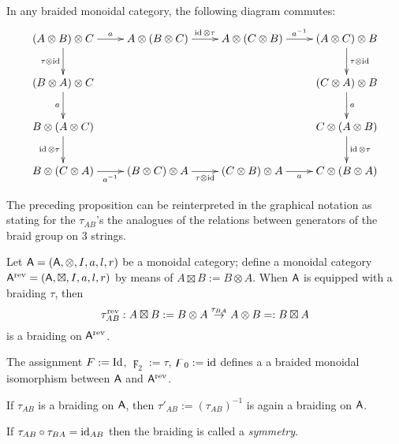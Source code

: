 \begin{proposition}
  In any braided monoidal category, the following diagram commutes:
  \begin{equation*}
    \xymatrix{%
      (A\otimes B)\otimes C
      &
      A\otimes(B\otimes C)
      &
      A\otimes(C\otimes B)
      &
      (A\otimes C)\otimes B
      \\
      (B\otimes A)\otimes C
      &
      &
      &
      (C\otimes A)\otimes B
      \\
      B\otimes(A\otimes C)
      &
      &
      &
      C\otimes(A\otimes B)
      \\
      B\otimes(C\otimes A)
      &
      (B\otimes C)\otimes A
      &
      (C\otimes B)\otimes A
      &
      C\otimes(B\otimes A)
      \ar"1,1";"1,2" ^{a} 
      \ar"1,2";"1,3" ^{\id\otimes\tau}
      \ar"1,3";"1,4" ^{a\inv}
      \ar"1,1";"2,1" _{\tau\otimes\id}
      \ar"1,4";"2,4" ^{\tau\otimes\id}
      \ar"2,1";"3,1" _{a}
      \ar"2,4";"3,4" ^{a}
      \ar"3,1";"4,1" _{\id\otimes\tau}
      \ar"3,4";"4,4" ^{\id\otimes\tau}
      \ar"4,1";"4,2" _{a\inv}
      \ar"4,2";"4,3" _{\tau\otimes\id}
      \ar"4,3";"4,4" _{a}
      }
  \end{equation*}
\end{proposition}
The preceding proposition can be reinterpreted in the graphical
notation as stating for the $\tau_{AB}$'s the analogues of the relations
between generators of the braid group on $3$ strings.

Let $\mathsf{A} = (\mathsf{A}, \otimes, I, a, l, r)$ be a monoidal category; define a
monoidal category $\mathsf{A}\sp{\text{rev}} = (\mathsf{A}, \boxtimes, I, a, l, r)$ by means of
$A \boxtimes B := B\otimes A$.  When $\mathsf{A}$ is equipped with a braiding $\tau$,
then
\begin{equation*}
  \tau\sp{\text{rev}}_{AB}: A\boxtimes B := B\otimes A \stackrel{\tau_{BA}}\to A\otimes B =:
  B\boxtimes A
\end{equation*}
is a braiding on $\mathsf{A}\sp{\text{rev}}$.

\begin{proposition}
  \label{thm:rev}
  The assignment $F := \operatorname{Id}$, $\digamma_2 := \tau$, $\digamma_0 := \operatorname{id}$ defines a a
  braided monoidal isomorphism between $\mathsf{A}$ and $\mathsf{A}\sp{\text{rev}}$.
\end{proposition}

If $\tau_{AB}$ is a braiding on $\mathsf{A}$, then $\tau'_{AB} := (\tau_{AB})^{-1}$
is again a braiding on $\mathsf{A}$.
\begin{definition}
  If $\tau_{AB} \circ \tau_{BA} = \operatorname{id}_{AB}$ then the braiding is called a
  \emph{symmetry}.   
\end{definition}


